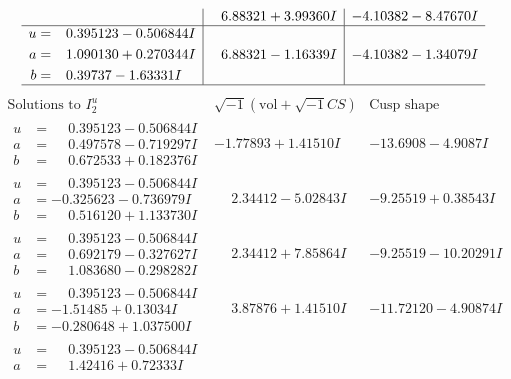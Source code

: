 \documentclass[1p]{elsarticle_modified}
\theoremstyle{definition}
\newcommand{\I}{\sqrt{-1}}
\begin{document}
$$\begin{array}{c|c|c}
 & \phantom{-}6.88321 + 3.99360 I & -4.10382 - 8.47670 I \\ \hline\begin{aligned}
u &= \phantom{-}0.395123 - 0.506844 I \\
a &= \phantom{-}1.090130 + 0.270344 I \\
b &= \phantom{-}0.39737 - 1.63331 I\end{aligned}
 & \phantom{-}6.88321 - 1.16339 I & -4.10382 - 1.34079 I\\
 \hline 
 \end{array}$$\newpage$$\begin{array}{c|c|c}  
\text{Solutions to }I^u_{2}& \I (\text{vol} + \sqrt{-1}CS) & \text{Cusp shape}\\
 \hline 
\begin{aligned}
u &= \phantom{-}0.395123 - 0.506844 I \\
a &= \phantom{-}0.497578 - 0.719297 I \\
b &= \phantom{-}0.672533 + 0.182376 I\end{aligned}
 & -1.77893 + 1.41510 I & -13.6908 - 4.9087 I \\ \hline\begin{aligned}
u &= \phantom{-}0.395123 - 0.506844 I \\
a &= -0.325623 - 0.736979 I \\
b &= \phantom{-}0.516120 + 1.133730 I\end{aligned}
 & \phantom{-}2.34412 - 5.02843 I & -9.25519 + 0.38543 I \\ \hline\begin{aligned}
u &= \phantom{-}0.395123 - 0.506844 I \\
a &= \phantom{-}0.692179 - 0.327627 I \\
b &= \phantom{-}1.083680 - 0.298282 I\end{aligned}
 & \phantom{-}2.34412 + 7.85864 I & -9.25519 - 10.20291 I \\ \hline\begin{aligned}
u &= \phantom{-}0.395123 - 0.506844 I \\
a &= -1.51485 + 0.13034 I \\
b &= -0.280648 + 1.037500 I\end{aligned}
 & \phantom{-}3.87876 + 1.41510 I & -11.72120 - 4.90874 I \\ \hline\begin{aligned}
u &= \phantom{-}0.395123 - 0.506844 I \\
a &= \phantom{-}1.42416 + 0.72333 I \\

\end{aligned}
\end{array}$$
\end{document}

